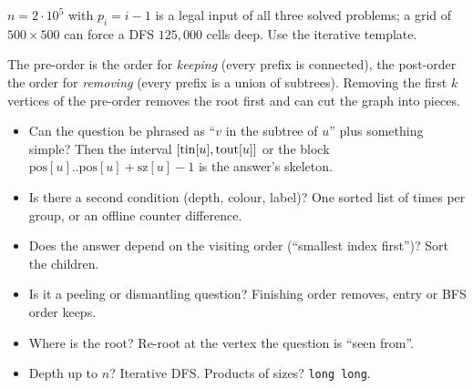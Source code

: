 \begin{warningbox}
$n = 2\cdot10^5$ with $p_i = i - 1$ is a legal input of all three solved problems; a grid of $500 \times 500$ can force a DFS $125{,}000$ cells deep. Use the iterative template.
\end{warningbox}

\begin{warningbox}
The pre-order is the order for \emph{keeping} (every prefix is connected), the post-order the order for \emph{removing} (every prefix is a union of subtrees). Removing the first $k$ vertices of the pre-order removes the root first and can cut the graph into pieces.
\end{warningbox}

\begin{checklistbox}
\begin{itemize}[leftmargin=*]
    \item[$\square$] Can the question be phrased as ``$v$ in the subtree of $u$'' plus something simple? Then the interval $[\mathrm{tin}[u], \mathrm{tout}[u]]$ or the block $\mathrm{pos}[u]..\mathrm{pos}[u]+\mathrm{sz}[u]-1$ is the answer's skeleton.
    \item[$\square$] Is there a second condition (depth, colour, label)? One sorted list of times per group, or an offline counter difference.
    \item[$\square$] Does the answer depend on the visiting order (``smallest index first'')? Sort the children.
    \item[$\square$] Is it a peeling or dismantling question? Finishing order removes, entry or BFS order keeps.
    \item[$\square$] Where is the root? Re-root at the vertex the question is ``seen from''.
    \item[$\square$] Depth up to $n$? Iterative DFS. Products of sizes? \texttt{long long}.
\end{itemize}
\end{checklistbox}
